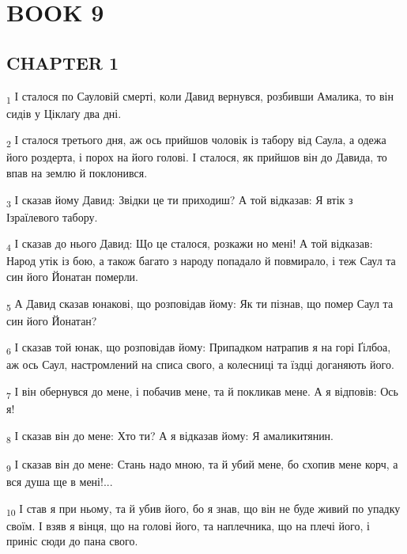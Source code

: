 \section{BOOK 9}
\subsection{CHAPTER 1}
\begin{tcolorbox}
\textsubscript{1} І сталося по Сауловій смерті, коли Давид вернувся, розбивши Амалика, то він сидів у Ціклаґу два дні.
\end{tcolorbox}
\begin{tcolorbox}
\textsubscript{2} І сталося третього дня, аж ось прийшов чоловік із табору від Саула, а одежа його роздерта, і порох на його голові. І сталося, як прийшов він до Давида, то впав на землю й поклонився.
\end{tcolorbox}
\begin{tcolorbox}
\textsubscript{3} І сказав йому Давид: Звідки це ти приходиш? А той відказав: Я втік з Ізраїлевого табору.
\end{tcolorbox}
\begin{tcolorbox}
\textsubscript{4} І сказав до нього Давид: Що це сталося, розкажи но мені! А той відказав: Народ утік із бою, а також багато з народу попадало й повмирало, і теж Саул та син його Йонатан померли.
\end{tcolorbox}
\begin{tcolorbox}
\textsubscript{5} А Давид сказав юнакові, що розповідав йому: Як ти пізнав, що помер Саул та син його Йонатан?
\end{tcolorbox}
\begin{tcolorbox}
\textsubscript{6} І сказав той юнак, що розповідав йому: Припадком натрапив я на горі Ґілбоа, аж ось Саул, настромлений на списа свого, а колесниці та їздці доганяють його.
\end{tcolorbox}
\begin{tcolorbox}
\textsubscript{7} І він обернувся до мене, і побачив мене, та й покликав мене. А я відповів: Ось я!
\end{tcolorbox}
\begin{tcolorbox}
\textsubscript{8} І сказав він до мене: Хто ти? А я відказав йому: Я амаликитянин.
\end{tcolorbox}
\begin{tcolorbox}
\textsubscript{9} І сказав він до мене: Стань надо мною, та й убий мене, бо схопив мене корч, а вся душа ще в мені!...
\end{tcolorbox}
\begin{tcolorbox}
\textsubscript{10} І став я при ньому, та й убив його, бо я знав, що він не буде живий по упадку своїм. І взяв я вінця, що на голові його, та наплечника, що на плечі його, і приніс сюди до пана свого.
\end{tcolorbox}
